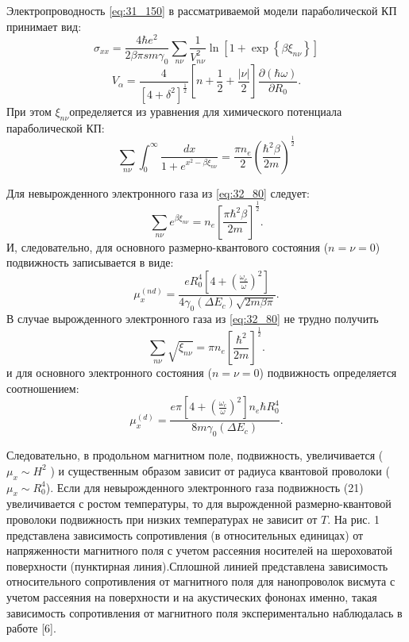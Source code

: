 Электропроводность \eqref{eq:31_150} в рассматриваемой модели параболической КП принимает вид:
\begin{equation} \label{eq:32_70}
\sigma _{xx} =\frac{4\hbar e^{2} }{2\beta \pi sm\gamma _{0} } \sum _{n\nu }\frac{1}{V_{n\nu }^{2} } \ln \left[1+\exp \left\{\beta \xi _{n\nu } \right\}\right]
\end{equation}
\[
V_{\alpha } =\frac{4}{\left[4+\delta ^{2} \right]^{\frac{1}{2} } } \left[n+\frac{1}{2} +\frac{\left|\nu \right|}{2} \right]\frac{\partial (\hbar \omega )}{\partial R_{0} } .
\] 
При этом $\xi _{n\nu } $определяется из уравнения для химического потенциала параболической КП:
\begin{equation} \label{eq:32_80}
\sum _{n\nu }\int _{0}^{\infty }\frac{dx}{1+e^{x^{2} -\beta \xi _{n\nu } } } =\frac{\pi n_{e} }{2} \left(\frac{\hbar ^{2} \beta }{2m} \right)^{\frac{1}{2} } 
\end{equation}

Для невырожденного электронного газа из \eqref{eq:32_80} следует:
\[
\sum _{n\nu }e^{\beta \xi _{n\nu } }  =n_{e} \left[\frac{\pi \hbar ^{2} \beta }{2m} \right]^{\frac{1}{2} } .
\] 
И, следовательно, для основного размерно-квантового состояния ($n=\nu =0$) подвижность записывается в виде:
\begin{equation} \label{eq:32_90}
\mu _{x}^{\left(nd\right)} =\frac{eR_{0}^{4} \left[4+\left(\frac{\omega _{c} }{\omega } \right)^{2} \right]}{4\gamma _{0} \left(\Delta E_{c} \right)\sqrt{2m\beta \pi } } . 
\end{equation}
В случае вырожденного электронного газа из \eqref{eq:32_80} не трудно получить
\[
\sum _{n\nu }\sqrt{\xi _{n\nu } }  =\pi n_{e} \left[\frac{\hbar ^{2} }{2m} \right]^{\frac{1}{2} } .
\] 
и для основного электронного состояния ($n=\nu =0$) подвижность определяется соотношением:
\begin{equation} \label{eq:32_100}
\mu _{x}^{\left(d\right)} =\frac{e\pi \left[4+\left(\frac{\omega _{c} }{\omega } \right)^{2} \right]n_{e} \hbar R_{0}^{4} }{8m\gamma _{0} \left(\Delta E_{c} \right)} .
\end{equation}
 
Следовательно, в продольном магнитном поле, подвижность, увеличивается ($\mu _{x} \sim H^{2} $ ) и существенным образом зависит от радиуса квантовой проволоки ($\mu _{x} \sim R_{0}^{4} $). Если для невырожденного электронного газа  подвижность (21) увеличивается с ростом температуры, то для вырожденной размерно-квантовой проволоки подвижность при низких температурах не зависит от $T$. На рис. 1 представлена зависимость сопротивления (в относительных единицах) от напряженности магнитного поля с учетом рассеяния носителей на шероховатой поверхности (пунктирная линия).Сплошной линией представлена зависимость относительного сопротивления от магнитного поля для нанопроволок висмута с учетом рассеяния на поверхности и на акустических фононах именно, такая зависимость сопротивления от магнитного поля экспериментально наблюдалась в работе \cite{Nikolaeva2004}[6].


